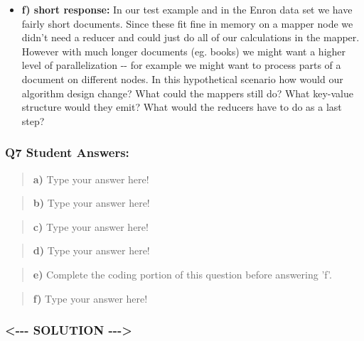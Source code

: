 \documentclass[11pt]{article}
\begin{document}
\begin{itemize}
{  need a reducer for this one.} \texttt{HINT\ 2:} \emph{Don't forget to
  add the model file to the} \texttt{-files} \emph{parameter in your
  Hadoop streaming job so that it gets shipped to the mapper nodes where
  it will be accessed by your script.}{]}
\item
  \textbf{f) short response:} In our test example and in the Enron data
  set we have fairly short documents. Since these fit fine in memory on
  a mapper node we didn't need a reducer and could just do all of our
  calculations in the mapper. However with much longer documents (eg.
  books) we might want a higher level of parallelization -\/- for
  example we might want to process parts of a document on different
  nodes. In this hypothetical scenario how would our algorithm design
  change? What could the mappers still do? What key-value structure
  would they emit? What would the reducers have to do as a last step?
\end{itemize}

    \subsubsection{Q7 Student Answers:}\label{q7-student-answers}

\begin{quote}
\textbf{a)} Type your answer here!
\end{quote}

\begin{quote}
\textbf{b)} Type your answer here!
\end{quote}

\begin{quote}
\textbf{c)} Type your answer here!
\end{quote}

\begin{quote}
\textbf{d)} Type your answer here!
\end{quote}

\begin{quote}
\textbf{e)} Complete the coding portion of this question before
answering 'f'.
\end{quote}

\begin{quote}
\textbf{f)} Type your answer here!
\end{quote}

    \subsubsection{\textless{}-\/-\/- SOLUTION
-\/-\/-\textgreater{}}\label{solution----}
\end{document}
